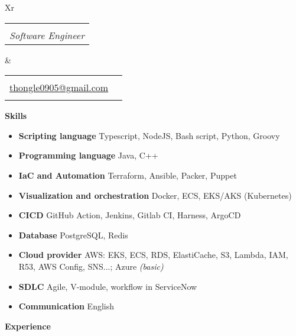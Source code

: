 \documentclass[letterpaper,12pt]{article}[leftmargin=*]
\makeatletter
\def \fullname {Thong Le Hoang}
\def \subtitle {Software Engineer}
\def \phoneicon {\faPhone}
\def \phonetext {+84-347-023-047}
\def \emailicon {\faEnvelope}
\def \emaillink {mailto:thongle0905@gmail.com}
\def \emailtext {thongle0905@gmail.com}
\def \addressicon {\faHome}
\def \addresstext {Ho Chi Minh, Viet Nam}
\def \headertype {\doublecol} %
\def \entryspacing {5pt}
\def \linkedin {\linkedinicon \hspace{3pt}\href{\linkedinlink}{\linkedintext}}
\def \phone {\phoneicon \hspace{3pt}{ \phonetext}}
\def \address {\addressicon \hspace{3pt}{ \addresstext}}
\def \email {\emailicon \hspace{3pt}\href{\emaillink}{\emailtext}}
\def \github {\githubicon \hspace{3pt}\href{\githublink}{\githubtext}}
\def \website {\websiteicon \hspace{3pt}\href{\websitelink}{\websitetext}}
\renewcommand{\section}[2]{\vspace{5pt}
  \colorbox{secondary}{\color{white}\raggedbottom\normalsize\textbf{{#1}{\hspace{7pt}#2}}}
}
\newcommand{\resumeEntryStart}{\begin{itemize}[leftmargin=2.5mm]}
\newcommand{\resumeEntryEnd}{\end{itemize}\vspace{\entryspacing}}
\newcommand{\resumeEntryS}[2]{
  \item[]\small{
    \textbf{\color{primary}#1 }{ #2 \vspace{-6pt}}
  }
}
\newcommand{\doublecol}[6]{
  \begin{tabularx}{\textwidth}{Xr}
    {
      \begin{tabular}[c]{l}
        \fontsize{35}{45}\selectfont{\color{primary}{{\textbf{\fullname}}}} \\
        {\textit{\subtitle}} %
      \end{tabular}
    } & {
      \begin{tabular}[c]{l@{\hspace{1.5em}}l}
        {\small#4} & {\small#1} \\
        {\small#5} & {\small#2} \\
        {\small#6} & {\small#3}
      \end{tabular}
    }
  \end{tabularx}
}
\newcommand{\singlecol}[6]{
  \begin{tabularx}{\textwidth}{Xr}
    {
      \begin{tabular}[b]{l}
        \fontsize{35}{45}\selectfont{\color{primary}{{\textbf{\fullname}}}} \\
        {\textit{\subtitle}} %
      \end{tabular}
    } & {
      \begin{tabular}[c]{l}
        {\small#1} \\
        {\small#2} \\
        {\small#3} \\
        {\small#4} \\
        {\small#5} \\
        {\small#6}
      \end{tabular}
    }
  \end{tabularx}
}
\makeatother
\begin{document}


\headertype{\linkedin}{\github}{\website}{\phone}{\email}{\address} %
\vspace{10pt} %

\section{\faChartLine}{Skills}
 \resumeEntryStart
  \resumeEntryS{Scripting language } {Typescript, NodeJS, Bash script, Python, Groovy}
  \resumeEntryS{Programming language } {Java, C++}
    \resumeEntryS{IaC and Automation } {Terraform, Ansible, Packer, Puppet}
  \resumeEntryS{Visualization and orchestration } {Docker, ECS, EKS/AKS (Kubernetes)}
  \resumeEntryS{CICD } {GitHub Action, Jenkins, Gitlab CI, Harness, ArgoCD}
  \resumeEntryS{Database } {PostgreSQL, Redis}
  \resumeEntryS{Cloud provider } {AWS: EKS, ECS, RDS, ElastiCache, S3, Lambda, IAM, R53, AWS Config, SNS...; Azure \textit{(basic)}}
  \resumeEntryS{SDLC } {Agile, V-module, workflow in ServiceNow}
  \resumeEntryS{Communication } {English}
 \resumeEntryEnd

\section{\faBriefcase}{Experience}
\end{document}
